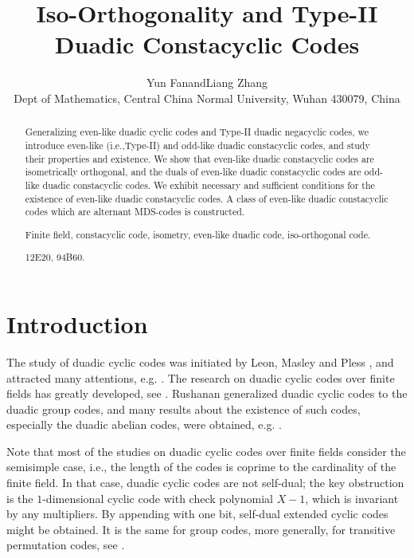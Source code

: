 \documentclass{article}
\numberwithin{equation}{section}
\numberwithin{table}{section}
\begin{document}
\title{%
Iso-Orthogonality and Type-II Duadic Constacyclic Codes}

\insert{}

\author{Yun Fan\quad and\quad Liang Zhang\\
\small Dept of Mathematics,
\small  Central China Normal University, Wuhan 430079, China}

\date{}

\maketitle

\begin{abstract}

Generalizing even-like duadic cyclic codes and Type-II duadic
negacyclic codes, we introduce even-like (i.e.,Type-II) and
odd-like duadic constacyclic codes,
and study their properties and existence.
We show that even-like duadic constacyclic codes are isometrically orthogonal,
and the duals of even-like duadic constacyclic codes
are odd-like duadic constacyclic codes.
We exhibit necessary and sufficient conditions for the existence
of even-like duadic constacyclic codes.
A class of even-like duadic constacyclic codes 
which are alternant MDS-codes is constructed.

Finite field, constacyclic code, isometry, even-like duadic code,
iso-orthogonal code.

 12E20, 94B60.
\end{abstract}

\section{Introduction}


The study of duadic cyclic codes was initiated by
Leon, Masley and Pless \cite{LMP}, and
attracted many attentions,  e.g. \cite{P87, S, DP,DLX,HK}.
The research on duadic cyclic codes over finite fields has greatly developed,
see \cite[Ch.6]{HP}.
Rushanan \cite{R} generalized duadic cyclic codes to 
the duadic group codes, and many results about the existence of
such codes, especially the duadic abelian codes, were obtained, e.g. \cite{WZ, AKS}.

Note that most of the studies on duadic cyclic codes over finite fields
consider the semisimple case, i.e.,
the length of the codes is coprime to the cardinality of the finite field.
In that case, duadic cyclic codes are not self-dual;
the key obstruction is the $1$-dimensional cyclic code with
check polynomial $X-1$, which is invariant by any multipliers.
By appending with one bit, self-dual extended cyclic codes might be obtained.
It is the same for group codes, more generally, for transitive permutation codes,
see \cite{FZ}.
\end{document}
